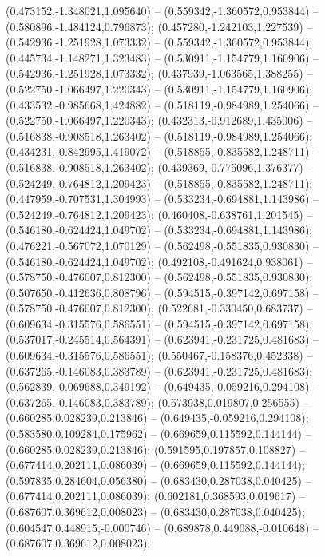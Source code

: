  (0.473152,-1.348021,1.095640) -- (0.559342,-1.360572,0.953844) -- (0.580896,-1.484124,0.796873);
 (0.457280,-1.242103,1.227539) -- (0.542936,-1.251928,1.073332) -- (0.559342,-1.360572,0.953844);
 (0.445734,-1.148271,1.323483) -- (0.530911,-1.154779,1.160906) -- (0.542936,-1.251928,1.073332);
 (0.437939,-1.063565,1.388255) -- (0.522750,-1.066497,1.220343) -- (0.530911,-1.154779,1.160906);
 (0.433532,-0.985668,1.424882) -- (0.518119,-0.984989,1.254066) -- (0.522750,-1.066497,1.220343);
 (0.432313,-0.912689,1.435006) -- (0.516838,-0.908518,1.263402) -- (0.518119,-0.984989,1.254066);
 (0.434231,-0.842995,1.419072) -- (0.518855,-0.835582,1.248711) -- (0.516838,-0.908518,1.263402);
 (0.439369,-0.775096,1.376377) -- (0.524249,-0.764812,1.209423) -- (0.518855,-0.835582,1.248711);
 (0.447959,-0.707531,1.304993) -- (0.533234,-0.694881,1.143986) -- (0.524249,-0.764812,1.209423);
 (0.460408,-0.638761,1.201545) -- (0.546180,-0.624424,1.049702) -- (0.533234,-0.694881,1.143986);
 (0.476221,-0.567072,1.070129) -- (0.562498,-0.551835,0.930830) -- (0.546180,-0.624424,1.049702);
 (0.492108,-0.491624,0.938061) -- (0.578750,-0.476007,0.812300) -- (0.562498,-0.551835,0.930830);
 (0.507650,-0.412636,0.808796) -- (0.594515,-0.397142,0.697158) -- (0.578750,-0.476007,0.812300);
 (0.522681,-0.330450,0.683737) -- (0.609634,-0.315576,0.586551) -- (0.594515,-0.397142,0.697158);
 (0.537017,-0.245514,0.564391) -- (0.623941,-0.231725,0.481683) -- (0.609634,-0.315576,0.586551);
 (0.550467,-0.158376,0.452338) -- (0.637265,-0.146083,0.383789) -- (0.623941,-0.231725,0.481683);
 (0.562839,-0.069688,0.349192) -- (0.649435,-0.059216,0.294108) -- (0.637265,-0.146083,0.383789);
 (0.573938,0.019807,0.256555) -- (0.660285,0.028239,0.213846) -- (0.649435,-0.059216,0.294108);
 (0.583580,0.109284,0.175962) -- (0.669659,0.115592,0.144144) -- (0.660285,0.028239,0.213846);
 (0.591595,0.197857,0.108827) -- (0.677414,0.202111,0.086039) -- (0.669659,0.115592,0.144144);
 (0.597835,0.284604,0.056380) -- (0.683430,0.287038,0.040425) -- (0.677414,0.202111,0.086039);
 (0.602181,0.368593,0.019617) -- (0.687607,0.369612,0.008023) -- (0.683430,0.287038,0.040425);
 (0.604547,0.448915,-0.000746) -- (0.689878,0.449088,-0.010648) -- (0.687607,0.369612,0.008023);

